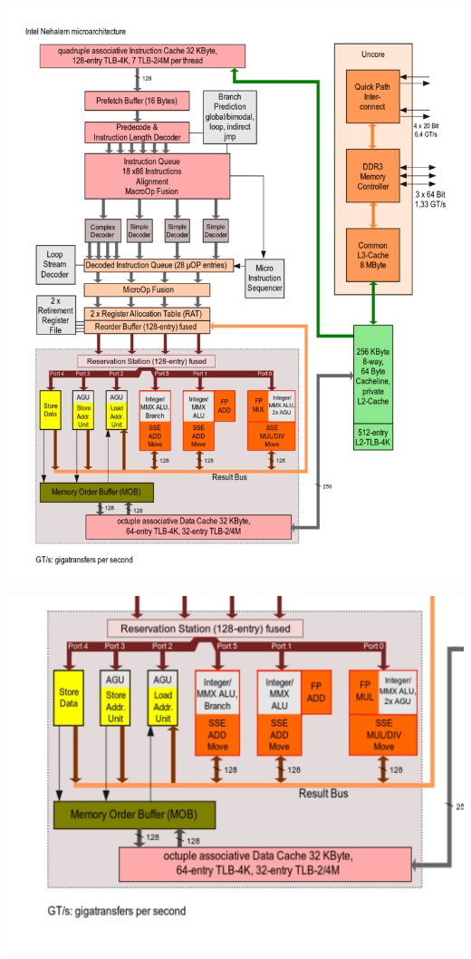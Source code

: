 \documentclass[sans,mathserif]{beamer}
\begin{document}
\begin{frame}
  \begin{center}
    \includegraphics[height=\textheight]{nehalem_arch.pdf}
  \end{center}
\end{frame}
\begin{frame}
  \begin{center}
    \includegraphics[height=\textheight]{nehalem_arch_crop.pdf}
  \end{center}
\end{frame}
\end{document}
